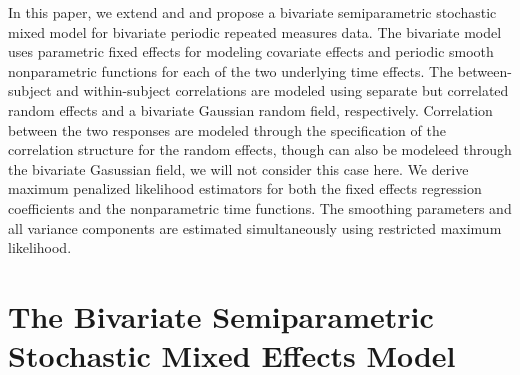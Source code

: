 \documentclass[article,lineno]{biometrika}
\begin{document}
In this paper, we extend \citet {Zhang:1998} and \citet{Zhan:Lin:Sowe:quan:2000} and propose a bivariate semiparametric stochastic mixed model for bivariate periodic repeated measures data.  The bivariate model uses parametric fixed effects for modeling covariate effects and periodic smooth nonparametric functions for each of the two underlying time effects. 
The between-subject and within-subject correlations are modeled using separate but correlated random effects and a bivariate Gaussian random field, respectively. 
Correlation between the two responses are modeled through the specification of the correlation structure for the random effects, though can also be modeleed through the bivariate Gasussian field, we will not consider this case here. 
We derive maximum penalized likelihood estimators for both the fixed effects regression coefficients and the nonparametric time functions. The smoothing parameters and all variance components are estimated simultaneously using restricted maximum likelihood.  


\section{The Bivariate Semiparametric Stochastic Mixed Effects Model} \label{modelSpe}


\end{document}
